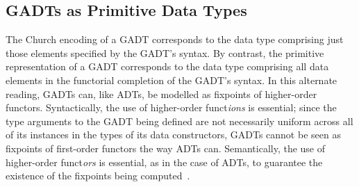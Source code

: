 \documentclass[acmsmall,screen,review,anonymous]{acmart}
\theoremstyle{definition}
\begin{document}
\subsection{GADTs as Primitive Data Types}\label{sec:prim-gadts}

The Church encoding of a GADT corresponds to the data type comprising
just those elements specified by the GADT's syntax. By contrast, the
primitive representation of a GADT corresponds to the data type
comprising all data elements in the functorial completion of the
GADT's syntax. In this alternate reading, GADTs can, like ADTs, be
modelled as fixpoints of higher-order functors. Syntactically, the use
of higher-order funct{\em ions} is essential; since the type arguments
to the GADT being defined are not necessarily uniform across all of
its instances in the types of its data constructors, GADTs cannot be
seen as fixpoints of first-order functors the way ADTs
can. Semantically, the use of higher-order funct{\em ors} is
essential, as in the case of ADTs, to guarantee the existence of the
fixpoints being computed~\cite{tfca}.
\end{document}
